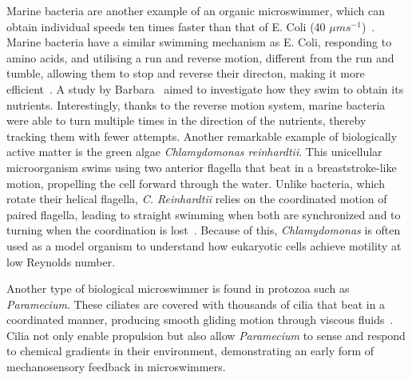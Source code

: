 Marine bacteria are another example of an organic microswimmer, which can obtain individual speeds ten times faster than that of E. Coli (40 $\mu m s^{-1}$)~\cite{mitchell1995long, lowe1987rapid}. Marine bacteria have a similar swimming mechanism as E. Coli, responding to amino acids, and utilising a run and reverse motion, different from the run and tumble, allowing them to stop and reverse their directon, making it more efficient~\cite{barbara2003marine}. A study by Barbara~\cite{barbara2003bacterial} aimed to investigate how they swim to obtain its nutrients. Interestingly, thanks to the reverse motion system, marine bacteria were able to turn multiple times in the direction of the nutrients, thereby tracking them with fewer attempts.
Another remarkable example of biologically active matter is the green algae \textit{Chlamydomonas reinhardtii}. This unicellular microorganism swims using two anterior flagella that beat in a breaststroke-like motion, propelling the cell forward through the water. Unlike bacteria, which rotate their helical flagella, \textit{C. Reinhardtii} relies on the coordinated motion of paired flagella, leading to straight swimming when both are synchronized and to turning when the coordination is lost~\cite{goldstein2015green}. Because of this, \textit{Chlamydomonas} is often used as a model organism to understand how eukaryotic cells achieve motility at low Reynolds number.

Another type of biological microswimmer is found in protozoa such as \textit{Paramecium}. These ciliates are covered with thousands of cilia that beat in a coordinated manner, producing smooth gliding motion through viscous fluids~\cite{zhang2015paramecia}. Cilia not only enable propulsion but also allow \textit{Paramecium} to sense and respond to chemical gradients in their environment, demonstrating an early form of mechanosensory feedback in microswimmers.

